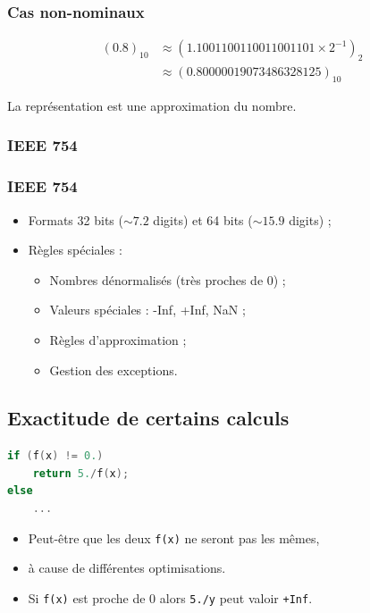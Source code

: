 \documentclass{beamer}
\begin{document}
\begin{frame}
    \frametitle{Cas non-nominaux}

    \begin{displaymath}
        \begin{split}
            (0.8)_{10} & \approx (1.1001100110011001101 \times 2^{-1})_{2} \\
            & \approx (0.80000019073486328125)_{10}
        \end{split}
    \end{displaymath}

    La représentation est une approximation du nombre.
\end{frame}

\subsubsection{IEEE 754}

\begin{frame}
    \frametitle{IEEE 754}

    \begin{itemize}
        \item Formats 32 bits ($\sim 7.2$ digits) et 64 bits ($\sim 15.9$ digits) ;
        \item Règles spéciales :
              \begin{itemize}
                  \item Nombres dénormalisés (très proches de $0$) ;
                  \item Valeurs spéciales : -Inf, +Inf, NaN ;
                  \item Règles d'approximation ;
                  \item Gestion des exceptions.
              \end{itemize}
    \end{itemize}
\end{frame}

\subsection{Exactitude de certains calculs}

\begin{frame}[fragile]
    \begin{lstlisting}[language=c++]
if (f(x) != 0.)
    return 5./f(x);
else
    ...
    \end{lstlisting}

    \begin{itemize}
        \item Peut-être que les deux \verb'f(x)' ne seront pas les mêmes,
        \item à cause de différentes optimisations.
        \item Si \verb'f(x)' est proche de $0$ alors \verb'5./y' peut valoir \verb'+Inf'.
    \end{itemize}
\end{frame}
\end{document}
